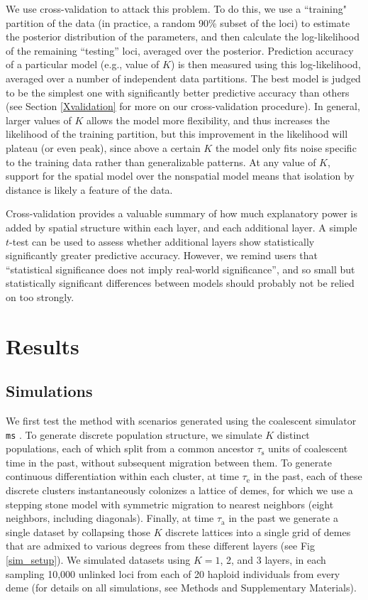 \documentclass[12pt]{article}
\newcommand{\gb}[1]{{\it\color{magenta}{(#1)}}}
\newcommand{\plr}[1]{{\it\color{purple}{(#1)}}}
\begin{document}
We use cross-validation to attack this problem.
To do this,
we use a ``training" partition of the data (in practice, a random 90\% subset of the loci)
to estimate the posterior distribution of the parameters,
and then calculate the log-likelihood of the remaining ``testing'' loci,
averaged over the posterior.
Prediction accuracy of a particular model (e.g., value of $K$)
is then measured using this log-likelihood,
averaged over a number of independent data partitions.
The best model is judged to be the simplest one with significantly better predictive accuracy
than others (see Section \ref{Xvalidation} for more on our cross-validation procedure).
In general, larger values of $K$ allows the model more flexibility,
and thus increases the likelihood of the training partition, 
but this improvement in the likelihood will plateau (or even peak), 
since above a certain $K$ the model only fits noise specific to the training data 
rather than generalizable patterns.
At any value of $K$, support for the spatial model over the nonspatial model 
means that isolation by distance is likely a feature of the data.

\gb{something about how we choose the best model?}
\plr{how's this?}
Cross-validation provides a valuable summary of how much explanatory power
is added by spatial structure within each layer, and each additional layer.
A simple $t$-test can be used to assess whether additional layers
show statistically significantly greater predictive accuracy.
However, we remind users that ``statistical significance does not imply real-world significance'',
and so small but statistically significant differences between models
should probably not be relied on too strongly.


\section*{Results}

\subsection*{Simulations}
We first test the method with scenarios generated using the coalescent simulator \texttt{ms} \citep{Hudson2002}.
To generate discrete population structure, we simulate $K$ distinct populations,
each of which split from a common ancestor $\tau_{\text{s}}$ units of coalescent time in the past,
without subsequent migration between them.
To generate continuous differentiation within each cluster,
at time $\tau_{\text{e}}$ in the past,
each of these discrete clusters instantaneously colonizes a lattice of demes,
for which we use a stepping stone model with symmetric migration 
to nearest neighbors (eight neighbors, including diagonals).
Finally, at time $\tau_{\text{a}}$ in the past 
we generate a single dataset %
by collapsing those $K$ discrete lattices into a single grid of demes that are admixed to various degrees from these different layers
(see Fig \ref{sim_setup}).
We simulated datasets using $K=1$, 2, and 3 layers,
in each sampling 10,000 unlinked loci from each of 20 haploid individuals from every deme
(for details on all simulations, see Methods and Supplementary Materials).
\end{document}
